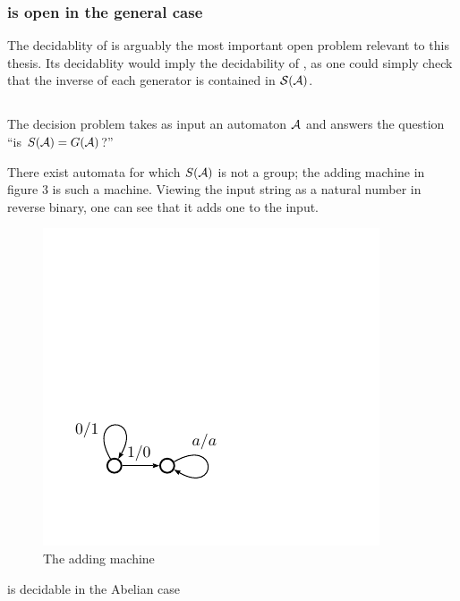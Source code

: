 \documentclass[11pt, titlepage]{article}
\begin{document}
\subsubsection{ is open in the general case}

The decidablity of  is arguably the most important
open problem relevant to this thesis. Its decidablity would imply the
decidability of , as one could simply check that the
inverse of each generator is contained in $\mathcal{S}(\mathcal{A})$.

\subsection{}
\begin{definition}
  The  decision problem takes as input an automaton
  $\mathcal{A}$ and answers the question ``is $S(\mathcal{A}) = G(\mathcal{A})$?''
\end{definition}

\begin{example}
  There exist automata for which $S(\mathcal{A})$ is not a group; the adding
  machine in figure 3 is such a machine. Viewing the input string as a
  natural number in reverse binary, one can see that it adds one to
  the input.
\end{example}
\begin{figure}
\begin{center}
\includegraphics[scale=0.7]{figures/adder}
\end{center}
\caption{The adding machine}
\end{figure}

\begin{proposition}
   is decidable in the Abelian case
\end{proposition}
\end{document}
